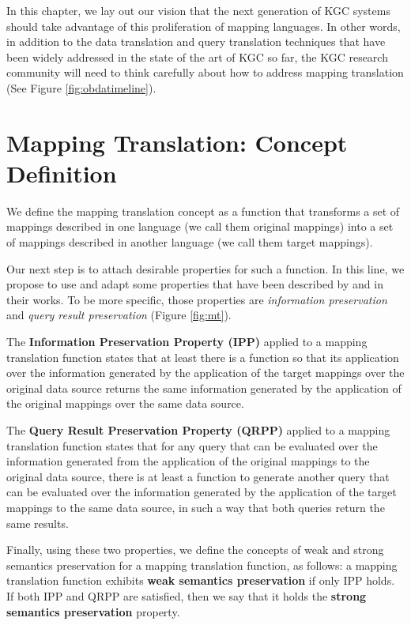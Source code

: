 In this chapter, we lay out our vision that the next generation of KGC systems should take advantage of this proliferation of mapping languages. In other words, in addition to the data translation and query translation techniques that have been widely addressed in the state of the art of KGC so far, the KGC research community will need to think carefully about how to address mapping translation (See Figure \ref{fig:obdatimeline}).


\section{Mapping Translation: Concept Definition}
We define the mapping translation concept as a function that transforms a set of mappings described in one language (we call them original mappings) into a set of mappings described in another language (we call them target mappings). 

Our next step is to attach desirable properties for such a function. In this line, we propose to use and adapt some properties that have been described by \citep{sequeda2012directly} and \citep{hartig2017foundations} in their works. To be more specific, those properties are \textit{information preservation} and \textit{query result preservation} (Figure \ref{fig:mt}).

The \textbf{Information Preservation Property (IPP)} applied to a mapping translation function states that at least there is a function so that its application over the information generated by the application of the target mappings over the original data source returns the same information generated by the application of the original mappings over the same data source.

The \textbf{Query Result Preservation Property (QRPP)} applied to a mapping translation function states that for any query that can be evaluated over the information generated from the application of the original mappings to the original data source, there is at least a function to generate another query that can be evaluated over the information generated by the application of the target mappings to the same data source, in such a way that both queries return the same results.


Finally, using these two properties, we define the concepts of weak and strong semantics preservation for a mapping translation function, as follows: a mapping translation function exhibits \textbf{weak semantics preservation} if only IPP holds. If both IPP and QRPP are satisfied, then we say that it holds the \textbf{strong semantics preservation} property.


